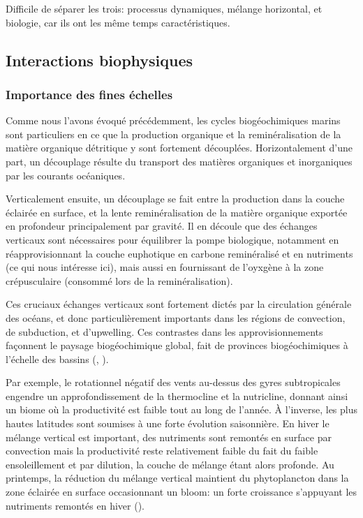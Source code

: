 Difficile de séparer les trois: processus dynamiques, mélange horizontal, et biologie, car ils ont les même temps caractéristiques.

\subsection{Interactions biophysiques}
\label{sec:interactions-biophys}

\subsubsection{Importance des fines échelles}

Comme nous l'avons évoqué précédemment, les cycles biogéochimiques marins sont particuliers en ce que la production organique et la reminéralisation de la matière organique détritique y sont fortement découplées.
Horizontalement d'une part, un découplage résulte du transport des matières organiques et inorganiques par les courants océaniques.

Verticalement ensuite, un découplage se fait entre la production dans la couche éclairée en surface, et la lente reminéralisation de la matière organique exportée en profondeur principalement par gravité.
Il en découle que des échanges verticaux sont nécessaires pour équilibrer la pompe biologique, notamment en réapprovisionnant la couche euphotique en carbone reminéralisé et en nutriments (ce qui nous intéresse ici), mais aussi en fournissant de l'oyxgène à la zone crépusculaire (consommé lors de la reminéralisation).


Ces cruciaux échanges verticaux sont fortement dictés par la circulation générale des océans, et donc particulièrement importants dans les régions de convection, de subduction, et d'upwelling.
Ces contrastes dans les approvisionnements façonnent le paysage biogéochimique global, fait de provinces biogéochimiques à l'échelle des bassins (, \cite{longhurst_2007,vichi_2011a,williams_2011,bock_2022}).

Par exemple, le rotationnel négatif des vents au-dessus des gyres subtropicales engendre un approfondissement de la thermocline et la nutricline, donnant ainsi un biome où la productivité est faible tout au long de l'année.
À l'inverse, les plus hautes latitudes  sont soumises à une forte évolution saisonnière.
En hiver le mélange vertical est important, des nutriments sont remontés en surface par convection mais la productivité reste relativement faible du fait du faible ensoleillement et par dilution, la couche de mélange étant alors profonde.
Au printemps, la réduction du mélange vertical maintient du phytoplancton dans la zone éclairée en surface occasionnant un bloom: un forte croissance s'appuyant les nutriments remontés en hiver (\cite{wilson_2005,siegel_2002,taylor_2011a,williams_2011}).

